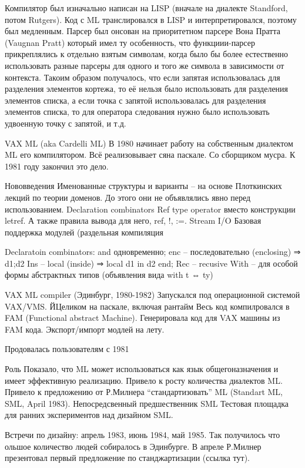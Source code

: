 \documentclass[14pt]{matmex-diploma-custom}
\begin{document}
 Компилятор был изначально написан на LISP (вначале на диалекте Standford, потом Rutgers). Код с ML транслировался в LISP и интерпретировался, поэтому был медленным. Парсер был онсован на приоритетном парсере Вона Пратта (Vaugnan Pratt) который имел ту особенность, что функциии-парсер прикреплялись к отдельно взятым символам, когда было бы более естественно использовать разные парсеры для одного и того же символа в зависимости от контекста. Такоим образом получалось, что если запятая использовалась для разделения элементов кортежа, то её нельзя было использовать для разделения элементов списка, а если точка с запятой использовалась для разделения элементов списка, то для оператора следования нужно было использовать удвоенную точку с запятой, и т.д.

VAX ML (aka Cardelli ML)
В 1980 начинает работу на собственным диалектом ML его компилятором. Всё реализовывает сяна паскале. Со сборщиком мусра. К 1981 году закончил это дело.

Нововведения
Именованные структуры и варианты -- на основе Плоткинских лекций по теории доменов.  До этого они не объявлялись явно перед использованием.
Declaration combinators
Ref type operator вместо конструкции letref. А также правила вывода для него, ref, !, :=.
Stream I/O
Базовая поддержка модулей (раздельная компиляция

Declaratoin combinators:
and одновременно;
enc -- последовательно (enclosing)  ⇒ d1;d2
Ins -- local (inside) ⇒ local d1 in d2 end;
Rec -- recusive
With -- для особой формы абстрактных типов (объявления вида with t ⇔ ty)

VAX ML compiler (Эдинбург, 1980-1982)
Запускался под операционной системой VAX/VMS.
ЙЦеликом на паскале, включая рантайм
Весь код компилровался в FAM (Functional abstract Machine).
Генерировала код для VAX машины из FAM кода.
Экспорт/импорт модлей на лету.

Продовалась пользователям с 1981

Роль
Показало, что ML может использоваться как язык общегоназначения и имеет эффективную реализацию. 
Привело к росту количества диалектов ML. Привело к предложению от Р.Милнера “стандартизовать” ML (Standart ML, SML, April 1983).
Непосредсвенный предшественник SML
Тестовая площадка для ранних экспериментов над дизайном SML.

 Встречи по дизайну: апрель 1983, июнь 1984, май 1985. Так получилось что ольшое количество людей собиралось в Эдинбурге. В апреле Р.Милнер презентовал первый предложение по станджартизации (ссылка тут). 
\end{document}
